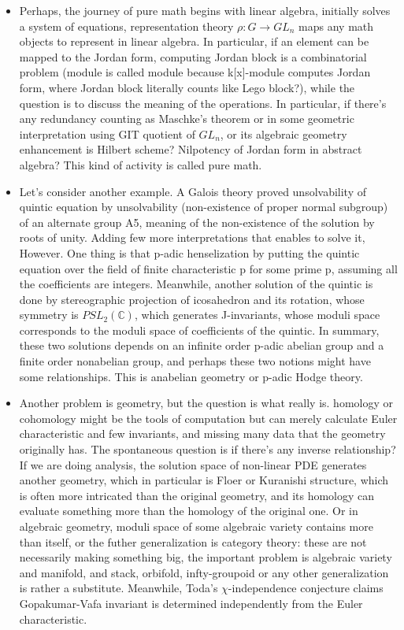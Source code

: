 \documentclass{article}
\begin{document}
\begin{itemize}
\item Perhaps, the journey of pure math begins with linear algebra, initially solves a system of equations,
representation theory $\rho: G\to GL_n$ maps any math objects to represent in linear algebra. 
In particular, if an element can be mapped to the Jordan form, computing Jordan block is a combinatorial problem
(module is called module because k[x]-module computes Jordan form, where Jordan block literally counts like Lego block?),
while the question is to discuss the meaning of the operations. 
In particular, if there's any redundancy counting as Maschke's theorem or in some geometric interpretation using GIT quotient of $GL_n$,
or its algebraic geometry enhancement is Hilbert scheme? Nilpotency of Jordan form in abstract algebra?
This kind of activity is called pure math. \\

\item Let's consider another example. A Galois theory proved unsolvability of quintic equation by unsolvability 
(non-existence of proper normal subgroup) of an alternate group A5, meaning of the non-existence of the solution by roots of unity.
Adding few more interpretations that enables to solve it, However.
One thing is that p-adic henselization by putting the quintic equation over the field of finite characteristic p for some prime p, 
assuming all the coefficients are integers.
Meanwhile, another solution of the quintic is done by stereographic projection of icosahedron and its rotation, 
whose symmetry is $PSL_2(\mathbb{C})$, which generates J-invariants, 
whose moduli space corresponds to the moduli space of coefficients of the quintic.
In summary, these two solutions depends on an infinite order p-adic abelian group and a finite order nonabelian group,
and perhaps these two notions might have some relationships. This is anabelian geometry or p-adic Hodge theory. \\

\item Another problem is geometry, but the question is what really is.
homology or cohomology might be the tools of computation but can merely calculate Euler characteristic and few invariants,
and missing many data that the geometry originally has.
The spontaneous question is if there's any inverse relationship?
If we are doing analysis, the solution space of non-linear PDE generates another geometry, which in particular is Floer or Kuranishi structure,
which is often more intricated than the original geometry, and its homology can evaluate something more than the homology of the original one.
Or in algebraic geometry, moduli space of some algebraic variety contains more than itself,
or the futher generalization is category theory: these are not necessarily making something big,
the important problem is algebraic variety and manifold, and stack, orbifold, infty-groupoid or any other generalization is rather a substitute.
Meanwhile, Toda's $\chi$-independence conjecture claims Gopakumar-Vafa invariant is determined independently from the Euler characteristic.
\end{itemize}
\end{document}
